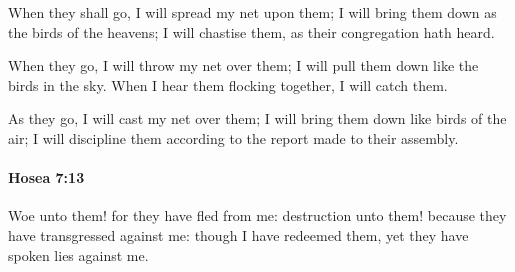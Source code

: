			\begin{versebox}
					\item[BHS] 
					\item[LXX] 
					\item[ASV] When they shall go, I will spread my net upon them; I will bring them down as the birds of the heavens; I will chastise them, as their congregation hath heard.
					\item[NIV] When they go, I will throw my net over them; I will pull them down like the birds in the sky. When I hear them flocking together, I will catch them.
					\item[NRSV] As they go, I will cast my net over them; I will bring them down like birds of the air; I will discipline them according to the report made to their assembly.
			\end{versebox}

		\paragraph{Hosea 7:13} %
			\label{HOSEA-7-13}

			Woe unto them! for they have fled from me: destruction unto them! because they have transgressed against me: though I have redeemed them, yet they have spoken lies against me.

